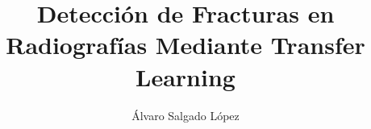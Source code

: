 \documentclass[journal]{IEEEtran}
\begin{document}
%
\title{Detección de Fracturas en Radiografías Mediante Transfer Learning}


\author{Álvaro Salgado López}

% 
%














\maketitle
\end{document}
